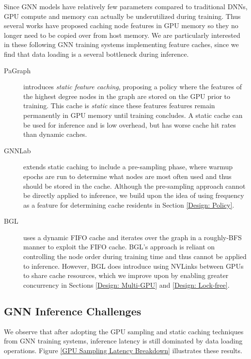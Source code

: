 Since GNN models have relatively few parameters compared to traditional DNNs, GPU compute and memory can actually be underutilized during training. Thus several works have proposed caching node features in GPU memory so they no longer need to be copied over from host memory. We are particularly interested in these following GNN training systems implementing feature caches, since we find that data loading is a several bottleneck during inference.

\begin{description}
    \item[PaGraph \cite{PaGraph_2020}] introduces \textit{static feature caching}, proposing a policy where the features of the highest degree nodes in the graph are stored on the GPU prior to training. This cache is \textit{static} since these features features remain permanently in GPU memory until training concludes. A static cache can be used for inference and is low overhead, but has worse cache hit rates than dynamic caches.
    \item[GNNLab \cite{GNNLab_2022}] extends static caching to include a pre-sampling phase, where warmup epochs are run to determine what nodes are most often used and thus should be stored in the cache. Although the pre-sampling approach cannot be directly applied to inference, we build upon the idea of using frequency as a feature for determining cache residents in Section \ref{Design: Policy}.
    \item[BGL \cite{BGL_2023}] uses a dynamic FIFO cache and iterates over the graph in a roughly-BFS manner to exploit the FIFO cache. BGL's approach is reliant on controlling the node order during training time and thus cannot be applied to inference. However, BGL does introduce using NVLinks between GPUs to share cache resources, which we improve upon by enabling greater concurrency in Sections \ref{Design: Multi-GPU} and \ref{Design: Lock-free}.
\end{description}

\subsection{GNN Inference Challenges}
We observe that after adopting the GPU sampling and static caching techniques from GNN training systems, inference latency is still dominated by data loading operations. Figure \ref{GPU Sampling Latency Breakdown} illustrates these results. 

